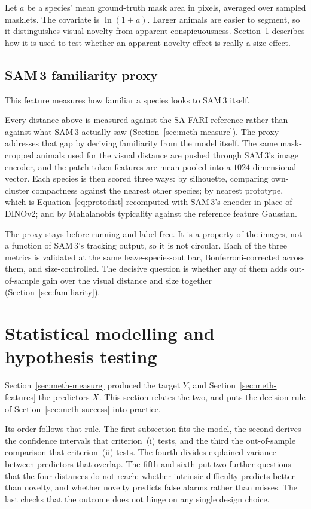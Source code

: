 Let $a$ be a species' mean ground-truth mask area in pixels, averaged over sampled masklets. The covariate is
$\ln(1+a)$. Larger animals are easier to segment, so it distinguishes visual novelty from apparent
conspicuousness. Section~\ref{sec:meth-model} describes how it is used to test whether an apparent novelty
effect is really a size effect.

\subsection{SAM\,3 familiarity proxy}
\label{sec:meth-familiarity}
This feature measures how familiar a species looks to SAM\,3 itself.

Every distance above is measured against the SA-FARI reference rather than against what SAM\,3 actually saw
(Section~\ref{sec:meth-measure}). The proxy addresses that gap by deriving familiarity from the model itself.
The same
mask-cropped animals used for the visual distance are pushed through SAM\,3's image encoder, and the
patch-token features are mean-pooled into a $1024$-dimensional vector. Each species is then scored three ways:
by silhouette, comparing own-cluster compactness against the nearest other species; by nearest prototype, which
is Equation~\ref{eq:protodist} recomputed with SAM\,3's encoder in place of DINOv2; and by Mahalanobis
typicality against the reference feature Gaussian.

The proxy stays before-running and label-free. It is a property of the images, not a function of SAM\,3's
tracking output, so it is not circular. Each of the three metrics is validated at the same leave-species-out
bar, Bonferroni-corrected across them, and size-controlled. The decisive question is whether any of them adds
out-of-sample gain over the visual distance and size together (Section~\ref{sec:familiarity}).

\section{Statistical modelling and hypothesis testing}
\label{sec:meth-model}
Section~\ref{sec:meth-measure} produced the target $Y$, and Section~\ref{sec:meth-features} the predictors $X$.
This section relates the two, and puts the decision rule of Section~\ref{sec:meth-success} into practice.

Its order follows that rule. The first subsection fits the model, the second derives the confidence intervals
that criterion~(i) tests, and the third the out-of-sample comparison that criterion~(ii) tests. The fourth
divides explained variance between predictors that overlap. The fifth and sixth put two further questions that
the four distances do not reach: whether intrinsic difficulty predicts better than novelty, and whether novelty
predicts false alarms rather than misses. The last checks that the outcome does not hinge on any single design
choice.

